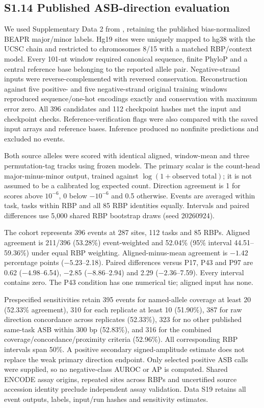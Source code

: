 \documentclass[11pt]{article}
\begin{document}
\subsection*{S1.14 Published ASB-direction evaluation}

We used Supplementary Data 2 from \citet{yang2019asb}, retaining the published bias-normalized BEAPR major/minor labels. Hg19 sites were uniquely mapped to hg38 with the UCSC chain and restricted to chromosomes 8/15 with a matched RBP/context model. Every 101-nt window required canonical sequence, finite PhyloP and a central reference base belonging to the reported allele pair. Negative-strand inputs were reverse-complemented with reversed conservation. Reconstruction against five positive- and five negative-strand original training windows reproduced sequence/one-hot encodings exactly and conservation with maximum error zero. All 396 candidates and 112 checkpoint hashes met the input and checkpoint checks. Reference-verification flags were also compared with the saved input arrays and reference bases. Inference produced no nonfinite predictions and excluded no events.

Both source alleles were scored with identical aligned, window-mean and three permutation-tag tracks using frozen models. The primary scalar is the count-head major-minus-minor output, trained against $\log(1+\text{observed total})$; it is not assumed to be a calibrated log expected count. Direction agreement is 1 for scores above $10^{-6}$, 0 below $-10^{-6}$ and 0.5 otherwise. Events are averaged within task, tasks within RBP and all 85 RBP identities equally. Intervals and paired differences use 5,000 shared RBP bootstrap draws (seed 20260924).

The cohort represents 396 events at 287 sites, 112 tasks and 85 RBPs. Aligned agreement is 211/396 (53.28\%) event-weighted and 52.04\% (95\% interval 44.51--59.36\%) under equal RBP weighting. Aligned-minus-mean agreement is $-1.42$ percentage points ($-5.23$--2.18). Paired differences versus P17, P43 and P97 are 0.62 ($-4.98$--6.54), $-2.85$ ($-8.86$--2.94) and 2.29 ($-2.36$--7.59). Every interval contains zero. The P43 condition has one numerical tie; aligned input has none.

Prespecified sensitivities retain 395 events for named-allele coverage at least 20 (52.33\% agreement), 310 for each replicate at least 10 (51.90\%), 387 for raw direction concordance across replicates (52.33\%), 323 for no other published same-task ASB within 300 bp (52.83\%), and 316 for the combined coverage/concordance/proximity criteria (52.96\%). All corresponding RBP intervals span 50\%. A positive secondary signed-amplitude estimate does not replace the weak primary direction endpoint. Only selected positive ASB calls were supplied, so no negative-class AUROC or AP is computed. Shared ENCODE assay origins, repeated sites across RBPs and uncertified source accession identity preclude independent assay validation. Data S19 retains all event outputs, labels, input/run hashes and sensitivity estimates.
\end{document}
